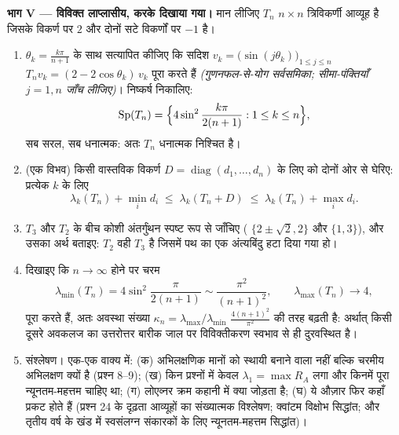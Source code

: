 \begin{problem}
\medskip
\noindent\textbf{भाग V --- विविक्त लाप्लासीय, करके दिखाया गया।} मान
लीजिए $T_n$ $n \times n$ त्रिविकर्णी आव्यूह है जिसके विकर्ण पर $2$ और दोनों
सटे विकर्णों पर $-1$ है।
\begin{enumerate}[resume]
  \item $\theta_k = \frac{k\pi}{n+1}$ के साथ सत्यापित कीजिए कि सदिश $v_k = \bigl(\sin(j\theta_k)\bigr)_{1\leq j\leq
        n}$ $T_nv_k = (2 - 2\cos\theta_k)\,v_k$ पूरा करते हैं
        \emph{(गुणनफल-से-योग सर्वसमिका; सीमा-पंक्तियाँ $j = 1, n$ जाँच लीजिए)}।
        निष्कर्ष निकालिए:
        \[
        \operatorname{Sp}(T_n) = \Bigl\{4\sin^2
        \frac{k\pi}{2(n+1)} : 1 \leq k \leq n\Bigr\},
        \]
        सब सरल, सब धनात्मक: अतः $T_n$ धनात्मक निश्चित है।
  \item (एक विभव) किसी वास्तविक विकर्ण $D =
        \operatorname{diag}(d_1, \dots, d_n)$ के लिए  को दोनों ओर से
        घेरिए: प्रत्येक $k$ के लिए
        \[
        \lambda_k(T_n) + \min_i d_i \;\leq\;
        \lambda_k(T_n + D) \;\leq\; \lambda_k(T_n) + \max_i
        d_i .
        \]
  \item $T_3$ और $T_2$ के बीच कोशी अंतर्गुंथन स्पष्ट रूप से जाँचिए (
        $\{2 \pm \sqrt2, 2\}$ और $\{1,
        3\}$), और उसका अर्थ बताइए: $T_2$ वही $T_3$ है जिसमें पथ का
        एक अंत्यबिंदु हटा दिया गया हो।
  \item दिखाइए कि $n \to
        \infty$ होने पर चरम 
        \[
        \lambda_{\min}(T_n) = 4\sin^2\frac{\pi}{2(n+1)}
        \sim \frac{\pi^2}{(n+1)^2},
        \qquad
        \lambda_{\max}(T_n) \to 4 ,
        \]
        पूरा करते हैं, अतः अवस्था संख्या $\kappa_n =
        \lambda_{\max}/\lambda_{\min}$ $\frac{4(n+1)^2}{\pi^2}$ की तरह बढ़ती है:
        अर्थात् किसी दूसरे अवकलज का उत्तरोत्तर बारीक जाल पर विविक्तीकरण
        स्वभाव से ही दुरवस्थित है।
  \item संश्लेषण। एक-एक वाक्य में: (क) अभिलक्षणिक मानों को स्थायी बनाने
        वाला  नहीं बल्कि चरमीय अभिलक्षण क्यों है (प्रश्न
        8--9); (ख) किन प्रश्नों में केवल $\lambda_1 = \max R_A$ लगा और किनमें पूरा
        न्यूनतम-महत्तम चाहिए था; (ग) लोएव्नर क्रम कहानी में क्या जोड़ता
        है; (घ) ये औज़ार फिर कहाँ प्रकट होते हैं (प्रश्न 24 के दृढ़ता
        आव्यूहों का संख्यात्मक विश्लेषण; क्वांटम विक्षोभ सिद्धांत; और
        तृतीय वर्ष के खंड में  स्वसंलग्न संकारकों के लिए
        न्यूनतम-महत्तम सिद्धांत)।
\end{enumerate}
\end{problem}
